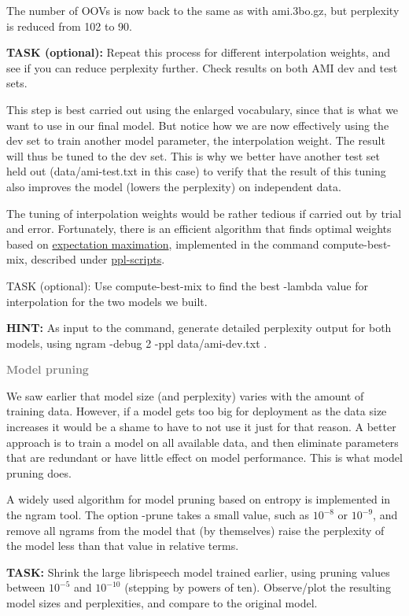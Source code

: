 The number of OOVs is now back to the same as with ami.3bo.gz, but perplexity is reduced from 102 to 90.

{\bf TASK (optional):} Repeat this process for different interpolation weights, and see if you can reduce perplexity further. Check results on both AMI dev and test sets.

This step is best carried out using the enlarged vocabulary, since that is what we want to use in our final model. But notice how we are now effectively using the dev set to train another model parameter, the interpolation weight. The result will thus be tuned to the dev set. This is why we better have another test set held out (data/ami-test.txt in this case) to verify that the result of this tuning also improves the model (lowers the perplexity) on independent data.

The tuning of interpolation weights would be rather tedious if carried out by trial and error. Fortunately, there is an efficient algorithm that finds optimal weights based on \href{https://en.wikipedia.org/wiki/Expectation\%E2\%80\%93maximization\_algorithm}{expectation maximation}, implemented in the command compute-best-mix, described under \href{http://www.speech.sri.com/projects/srilm/manpages/ppl-scripts.1.html}{ppl-scripts}.

TASK (optional): Use compute-best-mix to find the best -lambda value for interpolation for the two models we built.

{\bf HINT:} As input to the command, generate detailed perplexity output for both models, using ngram -debug 2 -ppl data/ami-dev.txt .

{\bf \textcolor{gray}{Model pruning}}

We saw earlier that model size (and perplexity) varies with the amount of training data. However, if a model gets too big for deployment as the data size increases it would be a shame to have to not use it just for that reason. A better approach is to train a model on all available data, and then eliminate parameters that are redundant or have little effect on model performance. This is what model pruning does.

A widely used algorithm for model pruning based on entropy is implemented in the ngram tool. The option -prune takes a small value, such as $10^{-8}$ or $10^{-9}$, and remove all ngrams from the model that (by themselves) raise the perplexity of the model less than that value in relative terms.

{\bf TASK:} Shrink the large librispeech model trained earlier, using pruning values between $10^{-5}$ and $10^{-10}$ (stepping by powers of ten). Observe/plot the resulting model sizes and perplexities, and compare to the original model.

